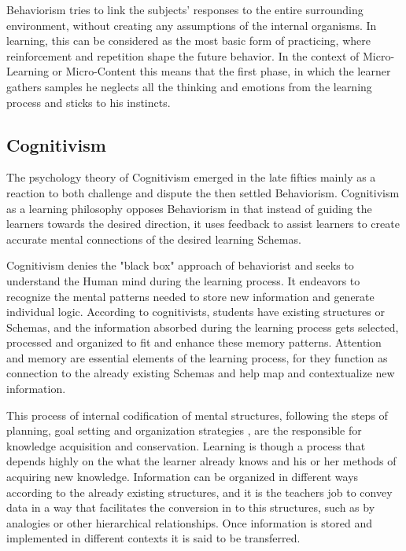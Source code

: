 Behaviorism tries to link the subjects' responses to the entire surrounding 
environment, without creating any assumptions of the internal organisms. In 
learning, this can be considered as the most basic form of practicing, where 
reinforcement and repetition shape the future behavior. In the context of 
Micro-Learning or Micro-Content this means that the first phase, in which the 
learner gathers samples he neglects all the thinking and emotions from the learning
process and sticks to his instincts.



\subsection{Cognitivism}

The psychology theory of Cognitivism emerged in the late fifties mainly as a 
reaction to both challenge and dispute the then settled Behaviorism.
Cognitivism as a learning philosophy opposes Behaviorism in that instead of 
guiding the learners towards the desired direction, it uses feedback to assist 
learners to create accurate mental connections of the desired learning Schemas.

Cognitivism denies the "black box" approach of behaviorist and seeks to understand
the Human mind during the learning process. It endeavors to recognize the mental 
patterns needed to store new information and generate individual logic.
According to cognitivists, students have existing structures or Schemas, and 
the information absorbed during the learning process gets selected, processed
and organized to fit and enhance these memory patterns. \cite{johnson}
Attention and memory are essential elements of the learning process, for they 
function as connection to the already existing Schemas and help map and contextualize
new information. 

This process of internal codification of mental structures, following the steps
of planning, goal setting and organization strategies \cite{johnson}, are the 
responsible for knowledge acquisition and conservation. Learning is though a 
process that depends highly on the what the learner already knows and his or her
methods of acquiring new knowledge. Information can be organized in different 
ways according to the already existing structures, and it is the teachers 
job to convey data in a way that facilitates the conversion in to this structures, 
such as by analogies or other hierarchical relationships. Once information is 
stored and implemented in different contexts it is said to be transferred. \cite{schunk}

